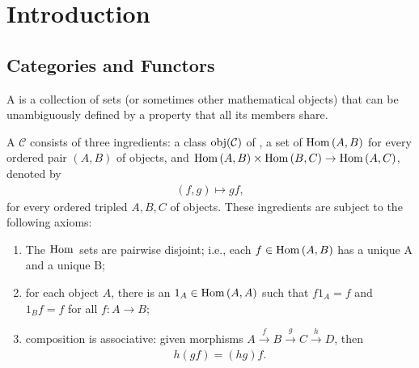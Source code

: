 \chapter{Introduction}\label{chapter:introduction}


\section{Categories and Functors}\label{sec:categories-and-functors}
    \begin{definition}\label{def:class}
        A  is a collection of sets (or sometimes other mathematical objects) that can be unambiguously defined by a property that all its members share.
    \end{definition}

    \begin{definition}\label{def:categories}
        A  $\mathcal{C}$ consists of three ingredients: a class $\operatorname{obj}({\mathcal{C})}$ of , a set of  $\operatorname{Hom}{(A,B)}$ for every ordered pair $(A,B)$ of objects, and  $\operatorname{Hom}{(A,B)} \times \operatorname{Hom}{(B,C)} \rightarrow \operatorname{Hom}{(A,C)}$, denoted by
            \begin{equation*}
            \begin{split}
                (f,g) \mapsto gf,
            \end{split}
            \end{equation*}
        for every ordered tripled $A,B,C$ of objects. These ingredients are subject to the following axioms:
            \begin{enumerate}[label = (\arabic*)]
                \item The $\operatorname{Hom}{}$ sets are pairwise disjoint; i.e., each $f \in \operatorname{Hom}{(A,B)}$ has a unique  A and a unique  B;
                \item for each object $A$, there is an  $1_A \in \operatorname{Hom}{(A,A)}$ such that $f 1_A = f$ and $1_B f = f$ for all $f: A \rightarrow B$;
                \item composition is associative: given morphisms $A \xrightarrow{f} B \xrightarrow{g} C \xrightarrow{h} D$, then 
                    \begin{equation*}
                    \begin{split}
                        h(gf)=(hg)f.
                    \end{split}
                    \end{equation*}
            \end{enumerate}
    \end{definition}

